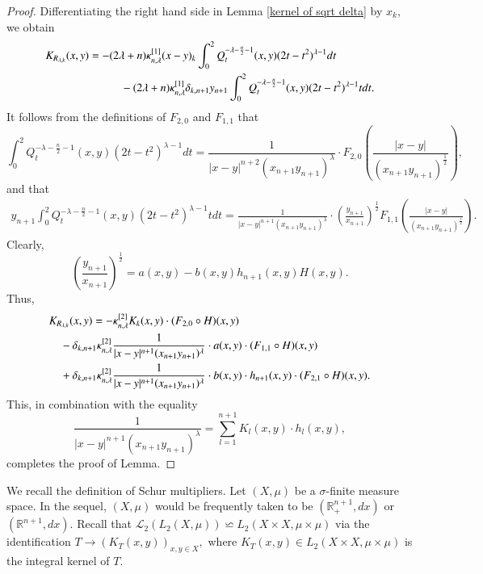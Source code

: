 \documentclass[12pt]{amsart}
\begin{document}
\begin{proof} Differentiating the right hand side in Lemma \ref{kernel of sqrt delta} by $x_{k},$ we obtain
\begin{align*}
K_{R_{\lambda,k}}(x,y)&=-(2\lambda+n)\kappa^{[1]}_{n,\lambda}(x-y)_{k}\int_0^2Q_t^{-\lambda-\frac{n}{2}-1}(x,y)(2t-t^2)^{\lambda-1}dt\\
&\hspace{1.0cm}-(2\lambda+n)\kappa^{[1]}_{n,\lambda}\delta_{k,n+1}y_{n+1}\int_0^2Q_t^{-\lambda-\frac{n}{2}-1}(x,y)(2t-t^2)^{\lambda-1}tdt.
\end{align*}
It follows from the definitions of $F_{2,0}$ and $F_{1,1}$ that
$$\int_0^2Q_t^{-\lambda-\frac{n}{2}-1}(x,y)(2t-t^2)^{\lambda-1}dt=\frac1{|x-y|^{n+2}(x_{n+1}y_{n+1})^{\lambda}}\cdot F_{2,0}(\frac{|x-y|}{(x_{n+1}y_{n+1})^{\frac12}}),$$
and that
\begin{align*}
y_{n+1}\int_0^2Q_t^{-\lambda-\frac{n}{2}-1}(x,y)(2t-t^2)^{\lambda-1}tdt
=\frac1{|x-y|^{n+1}(x_{n+1}y_{n+1})^{\lambda}}\cdot (\frac{y_{n+1}}{x_{n+1}})^{\frac12}F_{1,1}(\frac{|x-y|}{(x_{n+1}y_{n+1})^{\frac12}}).
\end{align*}
Clearly,
$$(\frac{y_{n+1}}{x_{n+1}})^{\frac12}=a(x,y)-b(x,y)h_{n+1}(x,y)H(x,y).$$
Thus,
\begin{align*}
K_{R_{\lambda,k}}(x,y)&=-\kappa^{[2]}_{n,\lambda}K_k(x,y)\cdot (F_{2,0}\circ H)(x,y)\\
&\hspace{-1.0cm}-\delta_{k,n+1}\kappa^{[2]}_{n,\lambda}\frac1{|x-y|^{n+1}(x_{n+1}y_{n+1})^{\lambda}}\cdot a(x,y)\cdot (F_{1,1}\circ H)(x,y)\\
&\hspace{-1.0cm}+\delta_{k,n+1}\kappa^{[2]}_{n,\lambda}\frac1{|x-y|^{n+1}(x_{n+1}y_{n+1})^{\lambda}}\cdot b(x,y)\cdot h_{n+1}(x,y)\cdot (F_{2,1}\circ H)(x,y).
\end{align*}
This, in combination with the equality
$$\frac1{|x-y|^{n+1}(x_{n+1}y_{n+1})^{\lambda}}=\sum_{l=1}^{n+1}K_l(x,y)\cdot h_l(x,y),$$
completes the proof of Lemma.
\end{proof}
We recall the definition of Schur multipliers. Let $(X,\mu)$ be a $\sigma$-finite measure space. {\color{blue}In the sequel, $(X,\mu)$ would be frequently taken to be $(\mathbb{R}_+^{n+1},dx)$ or $(\mathbb{R}^{n+1},dx)$.} Recall that $\mathcal{L}_2(L_2(X,\mu))\backsimeq L_2(X\times X,\mu\times\mu)$ via the identification $T\rightarrow (K_T(x,y))_{x,y\in X},$ where $K_T(x,y)\in L_2(X\times X,\mu\times\mu)$ is the integral kernel of $T.$
\end{document}
